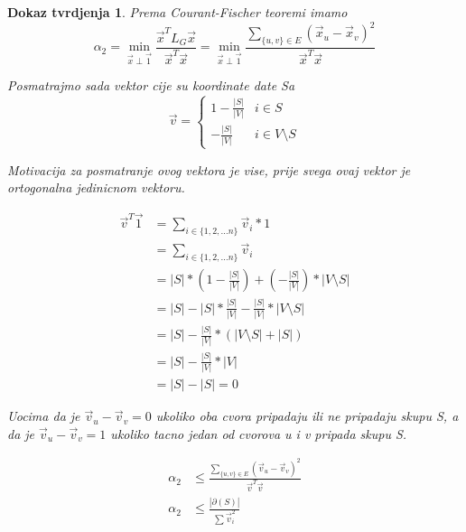 \documentclass[11pt]{article}
\newtheorem*{custom_proof}{Dokaz tvrdjenja}
\begin{document}
    \begin{custom_proof}
        Prema Courant-Fischer teoremi imamo
        \[
        \alpha_2 = \min_{\vec{x} \perp \vec{1}} \frac{\vec{x}^T L_G \vec{x}}{\vec{x}^T \vec{x}} 
        = \min_{\vec{x} \perp \vec{1}} \frac{ \sum_{\{u,v\} \in E} (\vec{x}_u - \vec{x}_v)^2}{\vec{x}^T \vec{x}}
        \]

        Posmatrajmo sada vektor cije su koordinate date Sa
        \[
            \vec{v} = 
            \begin{cases}
                1 - \frac{|S|}{|V|} & i \in S\\ 
                - \frac{|S|}{|V|} & i \in V \setminus S
            \end{cases}
        \]

        Motivacija za posmatranje ovog vektora je vise, prije svega ovaj vektor je ortogonalna jedinicnom vektoru.

        \[
        \begin{split}
            \vec{v}^T\vec{1} & = \sum_{i \in \{1,2, \dots n\}} \vec{v}_i * 1 \\
            & = \sum_{i \in \{1,2, \dots n\}} \vec{v}_i \\
            & = |S| * (  1 - \frac{|S|}{|V|} ) + ( -\frac{|S|}{|V|}) * |V \setminus S| \\
            & = |S| - |S| * \frac{|S|}{|V|} - \frac{|S|}{|V|} * |V \setminus S| \\
            & = |S| - \frac{|S|}{|V|} * (|V \setminus S| + |S|) \\
            & = |S| - \frac{|S|}{|V|} * |V| \\
            & = |S| - |S| = 0 
        \end{split}
        \]

        Uocima da je $\vec{v}_u - \vec{v}_v = 0$ ukoliko oba cvora pripadaju ili ne pripadaju skupu S, a da je $\vec{v}_u - \vec{v}_v = 1$ ukoliko tacno jedan od cvorova u i v pripada skupu S.
         
        \[
        \begin{split}
            \alpha_2  & \leq \frac{ \sum_{\{u,v\} \in E} (\vec{v}_u - \vec{v}_v)^2}{\vec{v}^T \vec{v}} \\
            \alpha_2  & \leq \frac{ |\partial(S)|}{\sum \vec{v}_i^2} 
        \end{split}
        \]
        

\end{custom_proof}
\end{document}
